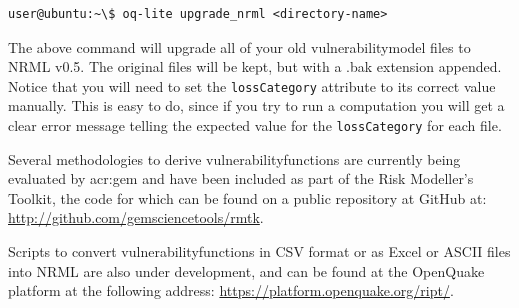 \begin{verbatim}
user@ubuntu:~\$ oq-lite upgrade_nrml <directory-name>
\end{verbatim}

The above command will upgrade all of your old \gls{vulnerabilitymodel} files to
NRML v0.5. The original files will be kept, but with a .bak extension
appended. Notice that you will need to set the \Verb+lossCategory+ attribute
to its correct value manually. This is easy to do, since if you try to run a
computation you will get a clear error message telling the expected value for
the \Verb+lossCategory+ for each file.


Several methodologies to derive \glspl{vulnerabilityfunction} are currently being
evaluated by \gls{acr:gem} and have been included as part of the Risk
Modeller's Toolkit, the code for which can be found on a public repository at
GitHub at: 
\href{http://github.com/gemsciencetools/rmtk}{http://github.com/gemsciencetools/rmtk}.

Scripts to convert \glspl{vulnerabilityfunction} in CSV format or as Excel or
ASCII files into NRML are also under development, and can be found at the
OpenQuake platform at the following address:
\href{https://platform.openquake.org/ript/}{https://platform.openquake.org/ript/}.
